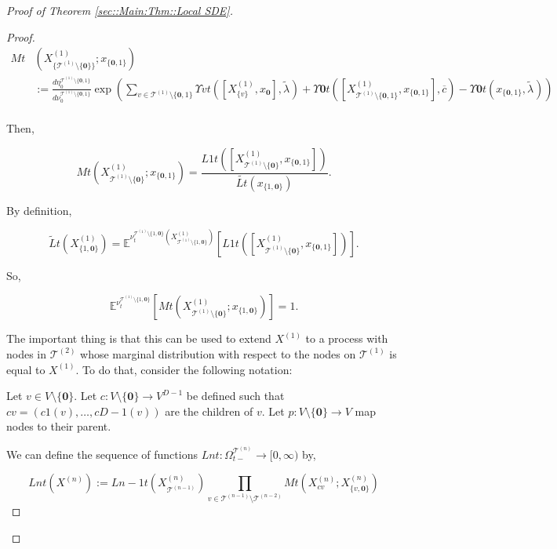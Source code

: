 \documentclass[12pt]{article}
\newcommand{\mb}{\mathbb}
\newcommand{\mc}{\mathcal}
\newcommand{\ra}{\rightarrow}
\newcommand{\ov}{\overline}
\newcommand{\ind}{\hspace{24pt}}
\newcommand{\exmu}[2]{\mb{E}^{#1}\left[#2\right]}	%
\newcommand{\defeq}{:=}								%
\renewcommand{\root}{\mathbf{0}}				%
\renewcommand{\v}{v}							%
\newcommand{\x}{x}								%
\renewcommand{\t}{t}							%
\newcommand{\sset}{\Omega}						%
\newcommand{\X}{X}								%
\newcommand{\vind}[1]{^{#1}}					%
\newcommand{\vsi}[1]{^{#1}}						%
\newcommand{\cind}[1]{_{#1}}					%
\newcommand{\tip}[1]{#1}						%
\newcommand{\ts}[1]{_{#1}}						%
\newcommand{\degr}{D}							%
\newcommand{\IGrg}{\ov{c}}						%
\newcommand{\tree}{\mc{T}}						%
\newcommand{\sln}[1]{^{(#1)}}					%
\newcommand{\alt}[1]{\widetilde{#1}}			%
\newcommand{\mm}{\nu}							%
\newcommand{\mmm}{\eta}							%
\newcommand{\crate}{\alt{\lambda}}				%
\newcommand{\dense}{L}							%
\newcommand{\cdense}{M}							%
\newcommand{\ds}{\Upsilon}						%
\renewcommand{\c}{c}							%
\newcommand{\p}{p}								%
\begin{document}
\begin{proof}[Proof of Theorem \ref{sec::Main:Thm::Local SDE}]
\begin{proof}
\begin{align*}
\cdense{}{\t}&(\X\sln{1}\cind{\{\tree\sln{1}\setminus\{\root\}\}}\tip{};\x\cind{\{\root,1\}}\tip{})\\
& \defeq\frac{d\mmm\vind{\tree\sln{1}\setminus\{\root,1\}}\ts{0}}{d\mm\vind{\tree\sln{1}\setminus\{\root,1\}}\ts{0}}\exp\left(\sum_{\v\in \tree\sln{1}\setminus\{\root,1\}} \ds{\v}{\t}([\X\sln{1}\cind{\{v\}}\tip{},\x\cind{\root}\tip{}],\crate\vind{}\ts{}) + \ds{\root}{\t}([\X\sln{1}\cind{\tree\sln{1}\setminus\{\root,1\}}\tip{},\x\cind{\{\root,1\}}\tip{}],\IGrg{}) - \ds{\root}{\t}(\x\cind{\{\root,1\}}\tip{},\crate\vind{}\ts{})\right)\\
\end{align*}

Then,

\[\cdense{}{\t}(\X\sln{1}\cind{\tree\sln{1}\setminus\{\root\}}\tip{};\x\cind{\{\root,1\}}\tip{}) = \frac{\dense{1}{\t}([\X\sln{1}\cind{\tree\sln{1}\setminus\{\root\}}\tip{},\x\cind{\{\root,1\}}\tip{}])}{\alt{\dense{}{\t}}(\x\cind{\{1,\root\}}\tip{})}.\]

By definition,

\[\alt{\dense}{}{\t}(\X\sln{1}\cind{\{1,\root\}}\tip{}) = \exmu{\mm\vind{\tree\sln{1}\setminus\{1,\root\}}\ts{\t}(\X\sln{1}\cind{\tree\sln{1}\setminus\{1,\root\}}\tip{})}{\dense{1}{\t}([\X\sln{1}\cind{\tree\sln{1}\setminus\{\root\}}\tip{},\x\cind{\{\root,1\}}\tip{}])}.\]

So,

\[\exmu{\mm\vind{\tree\sln{1}\setminus\{1,\root\}}\ts{\t}}{\cdense{}{\t}(\X\sln{1}\cind{\tree\sln{1}\setminus\{\root\}}\tip{};\x\cind{\{1,\root\}}\tip{})} = 1.\]

The important thing is that this can be used to extend \(\X\sln{1}\cind{}\tip{}\) to a process with nodes in \(\tree\sln{2}\) whose marginal distribution with respect to the nodes on \(\tree\sln{1}\) is equal to \(\X\sln{1}\cind{}\tip{}\). To do that, consider the following notation:

\ind Let \(\v \in V\setminus\{\root\}\). Let \(\c{}:V\setminus\{\root\} \ra V^{\degr-1}\) be defined such that \(\c{\v} = (\c{1}(\v),\dots,\c{\degr-1}(\v))\) are the children of \(\v\). Let \(\p{}:V\setminus\{\root\}\ra V\) map nodes to their parent.

\ind We can define the sequence of functions \(\dense{n}{\t}: \sset\vsi{\tree\sln{n}}\ts{\t-} \ra [0,\infty)\) by,

\[\dense{n}{\t}(\X\sln{n}\cind{}\tip{}) := \dense{n-1}{\t}(\X\sln{n}\cind{\tree\sln{n-1}}\tip{})\prod_{\v\in \tree\sln{n-1}\setminus\tree\sln{n-2}} \cdense{}{\t}(\X\sln{n}\cind{\c{\v}}\tip{};\X\sln{n}\cind{\{\v,\root\}}\tip{})\]


\end{proof}
\end{proof}
\end{document}
